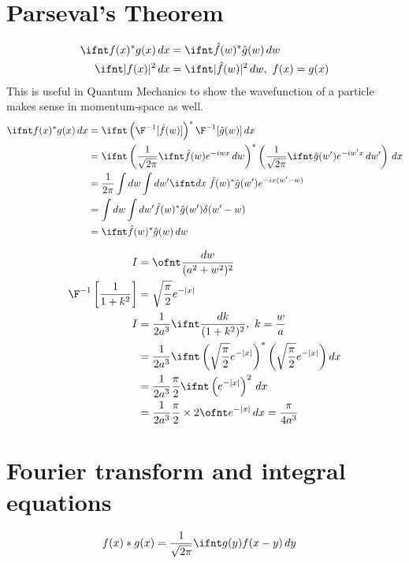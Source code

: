 \documentclass[cplx.tex]{subfiles}
\begin{document}
\section{Parseval's Theorem}
\begin{align}
    \ifnt f(x)^*g(x)\,dx &= \ifnt \hat{f}(w)^*\hat{g}(w)\,dw \\
    \ifnt |f(x)|^2\,dx &= \ifnt |\hat{f}(w)|^2\,dw,~ f(x) = g(x)
\end{align}
This is useful in Quantum Mechanics to show the wavefunction of a particle makes sense in momentum-space as well.
\begin{align}
    \ifnt f(x)^*g(x)\,dx &= \ifnt \left(\F^{-1}[\hat{f}(w)]\right)^*\F^{-1}[\hat{g}(w)]\,dx \\
                         &= \ifnt \left(\frac{1}{\sqrt{2\pi}} \ifnt \hat{f}(w)e^{-iwx}\,dw\right)^* \left(\frac{1}{\sqrt{2\pi}} \ifnt \hat{g}(w')e^{-iw'x}\,dw'\right)\,dx \\
                         &= \frac{1}{2\pi} \int dw \int dw' \ifnt dx\; \hat{f}(w)^*\hat{g}(w')e^{-ix(w'-w)} \\
                         &= \int dw \int dw' \hat{f}(w)^*\hat{g}(w')\delta(w'-w) \\
                         &= \ifnt \hat{f}(w)^* \hat{g}(w)\,dw
\end{align}

\begin{example}
\begin{align}
    I &= \ofnt \frac{dw}{(a^2+w^2)^2} \\
    \F^{-1}\left[\frac{1}{1+k^2}\right] &= \sqrt{\frac{\pi}{2}} e^{-|x|} \\
    I &= \frac{1}{2a^3} \ifnt \frac{dk}{(1+k^2)^2},~ k = \frac{w}{a} \\
      &= \frac{1}{2a^3} \ifnt \left(\sqrt{\frac{\pi}{2}} e^{-|x|}\right)^*\left(\sqrt{\frac{\pi}{2}} e^{-|x|}\right) dx \\
      &= \frac{1}{2a^3}\frac{\pi}{2} \ifnt \left(e^{-|x|}\right)^2\,dx \\
      &= \frac{1}{2a^3}\frac{\pi}{2} \times 2 \ofnt e^{-|x|}\,dx = \frac{\pi}{4a^3}
\end{align}
\end{example}

\section{Fourier transform and integral equations}
\begin{align}
    f(x)*g(x) &= \frac{1}{\sqrt{2\pi}} \ifnt g(y)f(x-y)\,dy
\end{align}
\end{document}
